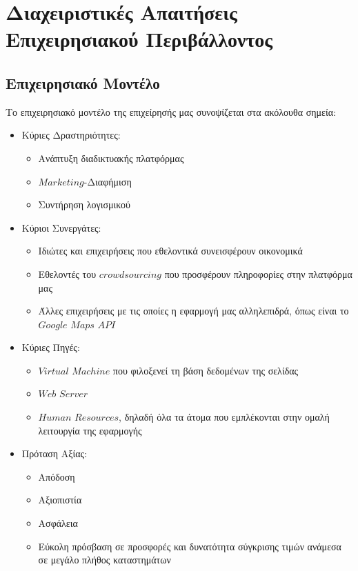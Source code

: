 \documentclass[12pt]{article}
\begin{document}
\section{Διαχειριστικές Απαιτήσεις Επιχειρησιακού Περιβάλλοντος}

\subsection{Επιχειρησιακό Μοντέλο}

Το επιχειρησιακό μοντέλο της επιχείρησής μας συνοψίζεται στα ακόλουθα σημεία:

\begin{itemize}
\item Κύριες Δραστηριότητες: 
	\begin{itemize}
	\item Ανάπτυξη διαδικτυακής πλατφόρμας
	\item $Marketing$-Διαφήμιση
	\item Συντήρηση λογισμικού
	\end{itemize}

	\item Κύριοι Συνεργάτες:
	\begin{itemize}
	\item Ιδιώτες και επιχειρήσεις που εθελοντικά συνεισφέρουν οικονομικά
	\item Εθελοντές του $crowdsourcing$ που προσφέρουν πληροφορίες στην πλατφόρμα μας
	\item Άλλες επιχειρήσεις με τις οποίες η εφαρμογή μας αλληλεπιδρά, όπως είναι το $Google$ $Maps$ $API$ 
	\end{itemize}		
	\item Κύριες Πηγές:
	\begin{itemize}
	\item $Virtual$ $Machine$ που φιλοξενεί τη βάση δεδομένων της σελίδας
	\item $Web$ $Server$
	\item $Human$ $Resources$, δηλαδή όλα τα άτομα που εμπλέκονται στην ομαλή λειτουργία της εφαρμογής
	\end{itemize}
	\item Πρόταση Αξίας:
	\begin{itemize}
	\item Απόδοση
	\item Αξιοπιστία
	\item Ασφάλεια
	\item Εύκολη πρόσβαση σε προσφορές και δυνατότητα σύγκρισης τιμών ανάμεσα σε μεγάλο πλήθος καταστημάτων
	\end{itemize}


\end{itemize}
\end{document}
